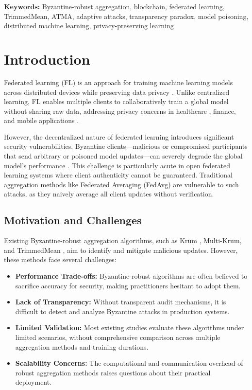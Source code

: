\documentclass[12pt,a4paper,onecolumn]{article}
\begin{document}
\noindent\textbf{Keywords:} Byzantine-robust aggregation, blockchain, federated learning, TrimmedMean, ATMA, adaptive attacks, transparency paradox, model poisoning, distributed machine learning, privacy-preserving learning

\section{Introduction}
\label{sec:introduction}

Federated learning (FL) is an approach for training machine learning models across distributed devices while preserving data privacy \cite{mcmahan2017communication,kairouz2021advances}. Unlike centralized learning, FL enables multiple clients to collaboratively train a global model without sharing raw data, addressing privacy concerns in healthcare \cite{xu2021federated}, finance, and mobile applications \cite{kang2020reliable}.

However, the decentralized nature of federated learning introduces significant security vulnerabilities. Byzantine clients---malicious or compromised participants that send arbitrary or poisoned model updates---can severely degrade the global model's performance \cite{blanchard2017machine,yin2018byzantine,cao2024comprehensive}. This challenge is particularly acute in open federated learning systems where client authenticity cannot be guaranteed. Traditional aggregation methods like Federated Averaging (FedAvg) \cite{mcmahan2017communication} are vulnerable to such attacks, as they naively average all client updates without verification.

\subsection{Motivation and Challenges}

Existing Byzantine-robust aggregation algorithms, such as Krum \cite{blanchard2017machine}, Multi-Krum, and TrimmedMean \cite{yin2018byzantine}, aim to identify and mitigate malicious updates. However, these methods face several challenges:

\begin{itemize}
    \item \textbf{Performance Trade-offs:} Byzantine-robust algorithms are often believed to sacrifice accuracy for security, making practitioners hesitant to adopt them.
    \item \textbf{Lack of Transparency:} Without transparent audit mechanisms, it is difficult to detect and analyze Byzantine attacks in production systems.
    \item \textbf{Limited Validation:} Most existing studies evaluate these algorithms under limited scenarios, without comprehensive comparison across multiple aggregation methods and training durations.
    \item \textbf{Scalability Concerns:} The computational and communication overhead of robust aggregation methods raises questions about their practical deployment.
\end{itemize}
\end{document}
